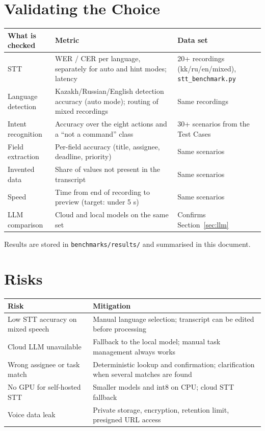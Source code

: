 \documentclass[11pt,a4paper]{article}
\newcommand{\tblstart}{\small\rowcolors{2}{gray!7}{white}}
\newcommand{\code}[1]{\texttt{#1}}
\begin{document}
\section{Validating the Choice}

{\tblstart
\begin{xltabular}{\textwidth}{P{3.6cm} L P{4.6cm}}
\toprule
\textbf{What is checked} & \textbf{Metric} & \textbf{Data set} \\
\midrule
\endhead
STT & WER / CER per language, separately for auto and hint modes; latency & 20+ recordings (kk/ru/en/mixed), \code{stt\_benchmark.py} \\
Language detection & Kazakh/Russian/English detection accuracy (auto mode); routing of mixed recordings & Same recordings \\
Intent recognition & Accuracy over the eight actions and a ``not a command'' class & 30+ scenarios from the Test Cases \\
Field extraction & Per-field accuracy (title, assignee, deadline, priority) & Same scenarios \\
Invented data & Share of values not present in the transcript & Same scenarios \\
Speed & Time from end of recording to preview (target: under 5 s) & Same scenarios \\
LLM comparison & Cloud and local models on the same set & Confirms Section~\ref{sec:llm} \\
\bottomrule
\end{xltabular}}

Results are stored in \code{benchmarks/results/} and summarised in this document.

\section{Risks}

{\tblstart
\begin{xltabular}{\textwidth}{P{5.4cm} L}
\toprule
\textbf{Risk} & \textbf{Mitigation} \\
\midrule
\endhead
Low STT accuracy on mixed speech & Manual language selection; transcript can be edited before processing \\
Cloud LLM unavailable & Fallback to the local model; manual task management always works \\
Wrong assignee or task match & Deterministic lookup and confirmation; clarification when several matches are found \\
No GPU for self-hosted STT & Smaller models and int8 on CPU; cloud STT fallback \\
Voice data leak & Private storage, encryption, retention limit, presigned URL access \\
\bottomrule
\end{xltabular}}
\end{document}
